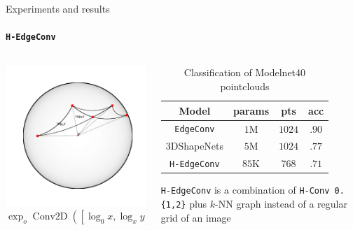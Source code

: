 \documentclass{beamer}
\begin{document}
\begin{frame}{Experiments and results}
    \framesubtitle{\texttt{H-EdgeConv}}

    \begin{columns}
        \begin{column}{.5\linewidth}\centering
                \includegraphics[width=.85\linewidth]{art/hedgeconv-features.pdf}
                \[\exp_o \operatorname{Conv2D}([\log_0x, \log_xy])\]
        \end{column}
        \begin{column}{.6\linewidth}
            \begin{table}[h!]
                \centering
                \begin{tabular}{|c c c c|} 
                    \hline
                    Model & params &
                    pts & acc
                    \\ [0.5ex] 
                    \hline\hline
                    \texttt{EdgeConv} & \( 1 \)M & \(1024\) & \(.90\)  \\ 
                    {\small 3DShapeNets} & \( 5 \)M & \(1024\) & \(.77\)  \\ 
                    \texttt{H-EdgeConv} & \( 85 \)K & 768 &  \( .71 \) \\ [1ex] 
                    \hline
                \end{tabular}
                \caption{Classification of Modelnet40 pointclouds}
            \end{table}

            \texttt{H-EdgeConv} is a combination of \texttt{H-Conv 0.\{1,2\}}
            plus \(k\)-NN graph instead of a regular grid of an image
        \end{column}
    \end{columns}
\end{frame}
\end{document}
